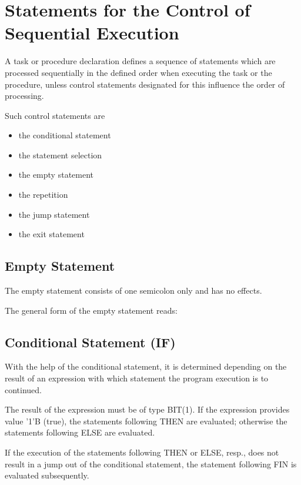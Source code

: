 
\chapter{Statements for the Control of Sequential Execution}   %

A task or procedure declaration defines a sequence of statements which
are processed sequentially in the defined order when executing the task or
the procedure, unless control statements designated for this influence the
order of processing.

Such control statements are
\begin{itemize}
\item the conditional statement
\item the statement selection
\item the empty statement
\item the repetition
\item the jump statement
\item the exit statement
\end{itemize}



\section{Empty Statement}
The empty statement  consists of one semicolon only and has no effects.

The general form of the empty statement reads:




\section{Conditional Statement (IF)}   %

With the help of the conditional statement, it is determined depending
on the result of an expression with which statement the program
execution is to continued.


The result of the expression must be of type BIT(1). If the expression
provides value '1'B (true), the statements following THEN are evaluated;
otherwise the statements following ELSE are evaluated.

If the execution of the statements following THEN or ELSE, resp., does
not result in a jump out of the conditional statement, the statement
following FIN is evaluated subsequently.

